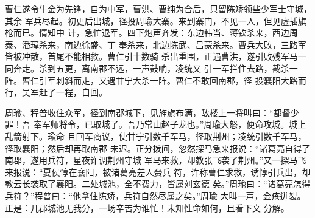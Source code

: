 曹仁遂令牛金为先锋，自为中军，曹洪、曹纯为合后，只留陈矫领些少军士守城，其余
军兵尽起。初更后出城，径投周瑜大寨。来到寨门，不见一人，但见虚插旗枪而已。情知中
计，急忙退军。四下炮声齐发：东边韩当、蒋钦杀来，西边周泰、潘璋杀来，南边徐盛、丁
奉杀来，北边陈武、吕蒙杀来。曹兵大败，三路军皆被冲散，首尾不能相救。曹仁引十数骑
杀出重围，正遇曹洪，遂引败残军马一同奔走。杀到五更，离南郡不远，一声鼓响，凌统又
引一军拦住去路，截杀一阵。曹仁引军刺斜而走，又遇甘宁大杀一阵。曹仁不敢回南郡，径
投襄阳大路而行，吴军赶了一程，自回。

周瑜、程普收住众军，径到南郡城下，见旌旗布满，敌楼上一将叫曰：“都督少罪！吾
奉军师将令，已取城了。吾乃常山赵子龙也。”周瑜大怒，便命攻城。城上乱箭射下。瑜命
且回军商议，使甘宁引数千军马，径取荆州；凌统引数千军马，径取襄阳；然后却再取南郡
未迟。正分拨间，忽然探马急来报说：“诸葛亮自得了南郡，遂用兵符，星夜诈调荆州守城
军马来救，却教张飞袭了荆州。”又一探马飞来报说：“夏侯惇在襄阳，被诸葛亮差人赍兵
符，诈称曹仁求救，诱惇引兵出，却教云长袭取了襄阳。二处城池，全不费力，皆属刘玄德
矣。”周瑜曰：“诸葛亮怎得兵符？”程普曰：“他拿住陈矫，兵符自然尽属之矣。”周瑜
大叫一声，金疮迸裂。正是：几郡城池无我分，一场辛苦为谁忙！未知性命如何，且看下文
分解。